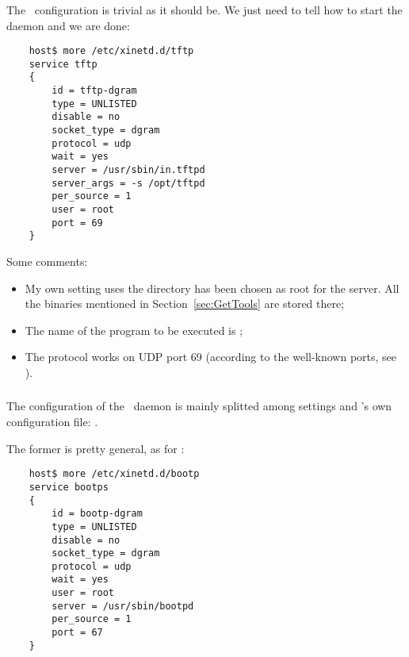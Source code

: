     \subsubsection{\TFTPd}

        The \TFTPd\ configuration is trivial as it should be. We just need
        to tell  how to start the daemon and we are
        done:

\begin{lstlisting}
    host$ more /etc/xinetd.d/tftp
    service tftp
    {
        id = tftp-dgram
        type = UNLISTED
        disable = no
        socket_type = dgram
        protocol = udp
        wait = yes
        server = /usr/sbin/in.tftpd
        server_args = -s /opt/tftpd
        per_source = 1
        user = root
        port = 69
    }
\end{lstlisting}

        Some comments:
        \begin{itemize}
        \item   My own setting uses the directory 
                has been chosen as root for the server. All the binaries
                mentioned in Section~\ref{sec:GetTools} are stored there;
        \item   The name of the program to be executed is
                ;
        \item   The protocol works on UDP port 69 (according to the
                well-known ports, see ).
        \end{itemize}

    \subsubsection{\BootPd}

        The configuration of the \BootPd\ daemon is mainly splitted among
         settings and \BootPd's own configuration file:
        .

        The former is pretty general, as for \TFTPd:
\begin{lstlisting}
    host$ more /etc/xinetd.d/bootp
    service bootps
    {
        id = bootp-dgram
        type = UNLISTED
        disable = no
        socket_type = dgram
        protocol = udp
        wait = yes
        user = root
        server = /usr/sbin/bootpd
        per_source = 1
        port = 67
    }
\end{lstlisting}

